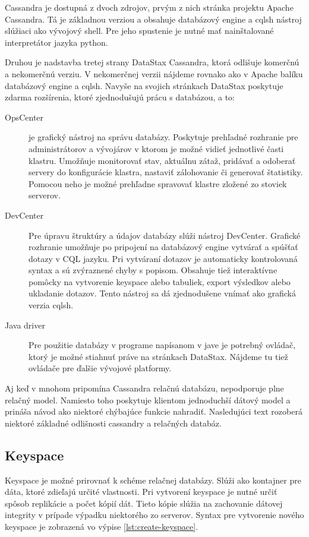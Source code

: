 	
	Cassandra je dostupná z dvoch zdrojov, prvým z nich stránka projektu Apache Cassandra. Tá je základnou verziou a obsahuje databázový engine a cqlsh nástroj slúžiaci ako vývojový shell. Pre jeho spustenie je nutné mať nainštalované interpretátor jazyka python.
	
	Druhou je nadstavba tretej strany DataStax Cassandra, ktorá odlišuje komerčnú a nekomerčnú verziu. V nekomerčnej verzii nájdeme rovnako ako v Apache balíku databázový engine a cqlsh. Navyše na svojich stránkach DataStax poskytuje zdarma rozšírenia, ktoré zjednodušujú prácu s databázou, a to:
	
	\begin{description}
		\item[OpsCenter] je grafický nástroj na správu databázy. Poskytuje prehľadné rozhranie pre administrátorov a vývojárov v ktorom je možné vidieť jednotlivé časti klastru. Umožňuje monitorovať stav, aktuálnu zátaž, pridávať a odoberať servery do konfigurácie klastra, nastaviť zálohovanie či generovať štatistiky. Pomocou neho je možné prehľadne spravovať klastre zložené zo stoviek serverov.

		\item[DevCenter] Pre úpravu štruktúry a údajov databázy slúži nástroj DevCenter. Grafické rozhranie umožňuje po pripojení na databázový engine vytvárať a spúšťať dotazy v CQL jazyku. Pri vytváraní dotazov je automaticky kontrolovaná syntax a sú zvýraznené chyby s popisom. 
		Obsahuje tiež interaktívne pomôcky na vytvorenie keyspace alebo tabuliek, export výsledkov alebo ukladanie dotazov.
		Tento nástroj sa dá zjednodušene vnímať ako grafická verzia cqlsh.

		\item[Java driver] Pre použitie databázy v programe napísanom v jave je potrebný ovládač, ktorý je možné stiahnuť práve na stránkach DataStax. Nájdeme tu tiež ovládače pre ďalšie vývojové platformy.
	\end{description}
	
	Aj keď v mnohom pripomína Cassandra relačnú databázu, nepodporuje plne relačný model. Namiesto toho poskytuje klientom jednoduchší dátový model a prináša návod ako niektoré chýbajúce funkcie nahradiť.
	Nasledujúci text rozoberá niektoré základné odlišnosti cassandry a relačných databáz.
	\subsection{Keyspace}
	Keyspace je možné prirovnať k schéme relačnej databázy. Slúži ako kontajner pre dáta, ktoré zdieľajú určité vlastnosti. Pri vytvorení keyspace je nutné určiť spôsob replikácie a počet kópií dát. Tieto kópie slúžia na zachovanie dátovej integrity v prípade výpadku niektorého zo serverov. Syntax pre vytvorenie nového keyspace je zobrazená vo výpise \ref{lst:create-keyspace}.

